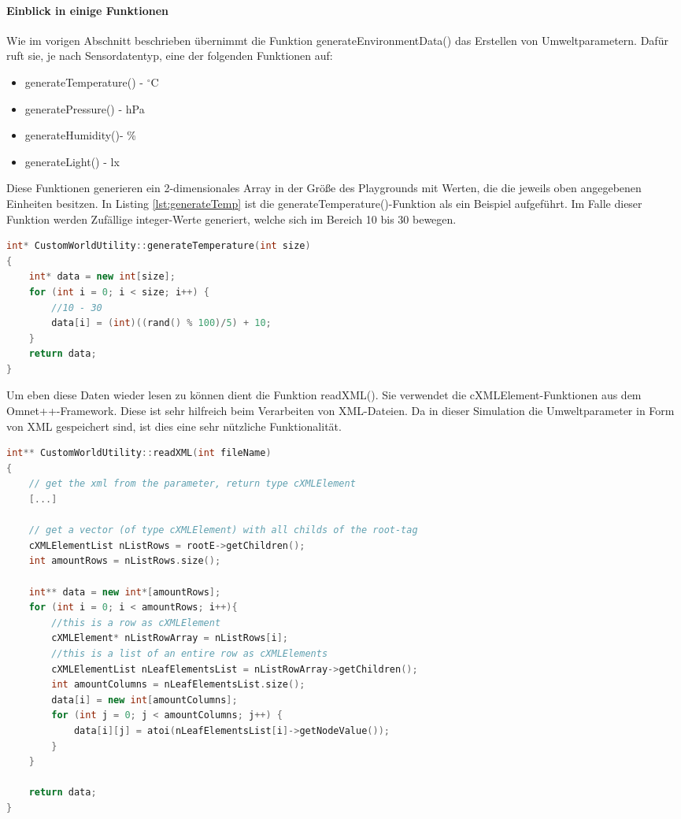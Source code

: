 \paragraph{Einblick in einige Funktionen}

Wie im vorigen Abschnitt beschrieben übernimmt die Funktion generateEnvironmentData() das Erstellen von Umweltparametern. Dafür ruft sie, je nach Sensordatentyp, eine der folgenden Funktionen auf:

\begin{multicols}{2}
\begin{itemize}
\item generateTemperature() - $^\circ $C
\item generatePressure() - hPa
\item generateHumidity()- \%
\item generateLight() - lx
\end{itemize}
\end{multicols}

Diese Funktionen generieren ein 2-dimensionales Array in der Größe des Playgrounds mit Werten, die die jeweils oben angegebenen Einheiten besitzen. In Listing \ref{lst:generateTemp} ist die generateTemperature()-Funktion als ein Beispiel aufgeführt. Im Falle dieser Funktion werden Zufällige integer-Werte generiert, welche sich im Bereich 10 bis 30 bewegen.

\begin{lstlisting}[language=C++, label=lst:generateTemp]
int* CustomWorldUtility::generateTemperature(int size)
{
    int* data = new int[size];
    for (int i = 0; i < size; i++) {
        //10 - 30
        data[i] = (int)((rand() % 100)/5) + 10;
    }
    return data;
}
\end{lstlisting}

Um eben diese Daten wieder lesen zu können dient die Funktion readXML(). Sie verwendet die cXMLElement-Funktionen aus dem Omnet++-Framework. Diese ist sehr hilfreich beim Verarbeiten von XML-Dateien. Da in dieser Simulation die Umweltparameter in Form von XML gespeichert sind, ist dies eine sehr nützliche Funktionalität.

\begin{lstlisting}[language=C++]
int** CustomWorldUtility::readXML(int fileName)
{
    // get the xml from the parameter, return type cXMLElement
    [...]

    // get a vector (of type cXMLElement) with all childs of the root-tag
    cXMLElementList nListRows = rootE->getChildren();
    int amountRows = nListRows.size();

    int** data = new int*[amountRows];
    for (int i = 0; i < amountRows; i++){
        //this is a row as cXMLElement
        cXMLElement* nListRowArray = nListRows[i];
        //this is a list of an entire row as cXMLElements
        cXMLElementList nLeafElementsList = nListRowArray->getChildren();
        int amountColumns = nLeafElementsList.size();
        data[i] = new int[amountColumns];
        for (int j = 0; j < amountColumns; j++) {
            data[i][j] = atoi(nLeafElementsList[i]->getNodeValue());
        }
    }

    return data;
}
\end{lstlisting}

